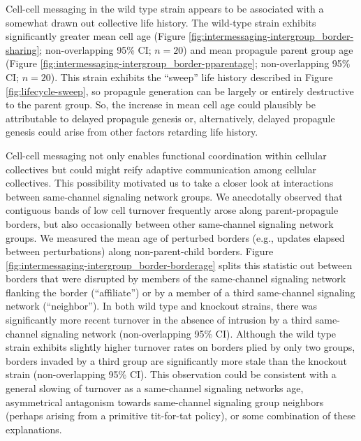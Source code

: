 Cell-cell messaging in the wild type strain appears to be associated with a somewhat drawn out collective life history.
The wild-type strain exhibits significantly greater mean cell age (Figure \ref{fig:intermessaging-intergroup_border-sharing}; non-overlapping 95\% CI; $n=20$) and mean propagule parent group age (Figure \ref{fig:intermessaging-intergroup_border-pparentage}; non-overlapping 95\% CI; $n=20$).
This strain exhibits the ``sweep'' life history described in Figure \ref{fig:lifecycle-sweep}, so propagule generation can be largely or entirely destructive to the parent group.
So, the increase in mean cell age could plausibly be attributable to delayed propagule genesis or, alternatively, delayed propagule genesis could arise from other factors retarding life history.

Cell-cell messaging not only enables functional coordination within cellular collectives but could might reify adaptive communication among cellular collectives.
This possibility motivated us to take a closer look at interactions between same-channel signaling network groups.
We anecdotally observed that contiguous bands of low cell turnover frequently arose along parent-propagule borders, but also occasionally between other same-channel signaling network groups.
We measured the mean age of perturbed borders (e.g., updates elapsed between perturbations) along non-parent-child borders.
Figure \ref{fig:intermessaging-intergroup_border-borderage} splits this statistic out between borders that were disrupted by members of the same-channel signaling network flanking the border (``affiliate'') or by a member of a third same-channel signaling network (``neighbor'').
In both wild type and knockout strains, there was significantly more recent turnover in the absence of intrusion by a third same-channel signaling network (non-overlapping 95\% CI).
Although the wild type strain exhibits slightly higher turnover rates on borders plied by only two groups, borders invaded by a third group are significantly more stale than the knockout strain (non-overlapping 95\% CI).
This observation could be consistent with a general slowing of turnover as a same-channel signaling networks age, asymmetrical antagonism towards same-channel signaling group neighbors (perhaps arising from a primitive tit-for-tat policy), or some combination of these explanations.

